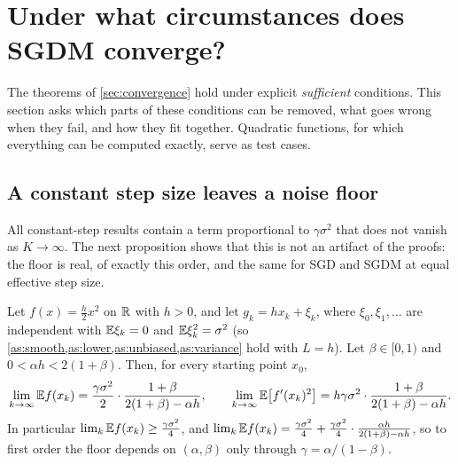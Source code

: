 \section{Under what circumstances does SGDM converge?}\label{sec:circumstances}

The theorems of \cref{sec:convergence} hold under explicit \emph{sufficient} conditions.
This section asks which parts of these conditions can be removed, what goes wrong when
they fail, and how they fit together. Quadratic functions, for which everything can be
computed exactly, serve as test cases.

\subsection{A constant step size leaves a noise floor}

All constant-step results contain a term proportional to $\gamma\sigma^2$ that does not
vanish as $K\to\infty$. The next proposition shows that this is not an artifact of the
proofs: the floor is real, of exactly this order, and the same for SGD and SGDM at equal
effective step size.

\begin{proposition}\label{prop:noise-floor}
Let $f(x)=\frac h2x^2$ on $\mathbb{R}$ with $h>0$, and let $g_k=hx_k+\xi_k$, where
$\xi_0,\xi_1,\dots$ are independent with $\mathbb{E}\xi_k=0$ and $\mathbb{E}\xi_k^2=\sigma^2$ (so
\cref{as:smooth,as:lower,as:unbiased,as:variance} hold with $L=h$). Let $\beta\in[0,1)$ and
$0<\alpha h<2(1+\beta)$. Then, for every starting point $x_0$,
\begin{equation}\label{eq:noise-floor}
  \lim_{k\to\infty}\mathbb{E} f(x_k)=\frac{\gamma\sigma^2}{2}\cdot\frac{1+\beta}{2(1+\beta)-\alpha h},
  \qquad
  \lim_{k\to\infty}\mathbb{E}\bigl[f'(x_k)^2\bigr]=h\gamma\sigma^2\cdot\frac{1+\beta}{2(1+\beta)-\alpha h}.
\end{equation}
In particular $\lim_k\mathbb{E} f(x_k)\ge\frac{\gamma\sigma^2}{4}$, and
$\lim_k\mathbb{E} f(x_k)=\frac{\gamma\sigma^2}{4}+\frac{\gamma\sigma^2}{4}\cdot\frac{\alpha h}{2(1+\beta)-\alpha h}$,
so to first order the floor depends on $(\alpha,\beta)$ only through $\gamma=\alpha/(1-\beta)$.
\end{proposition}

